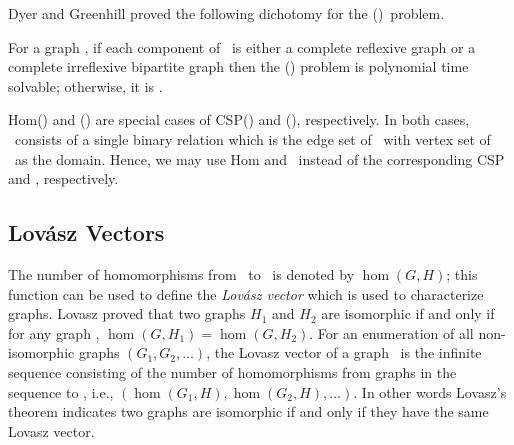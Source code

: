 Dyer and Greenhill proved the following dichotomy for the \chom(\mH)\ problem.
\begin{theorem} 
For a graph \mH, if each component of \mH\ is either a complete reflexive graph
or a complete irreflexive bipartite graph then the \chom(\mH) problem 
is polynomial time solvable; otherwise, it is \cpc\@.
\end{theorem}

Hom(\mH) and \chom(\mH) are special cases of CSP(\mrelset) and \ccsp(\mrelset),
respectively. In both cases, \mrelset\ consists of a single binary relation which is the
edge set of \mH\ with vertex set of \mH\ as the domain.
Hence, we may use Hom and \chom\ instead of
the corresponding CSP and \ccsp, respectively. 

\subsection*{Lov\'{a}sz Vectors}
The number of homomorphisms from \mG\ to \mH\ is denoted by \(\hom(G,H)\); this function
can be used to define the \emph{Lov\'{a}sz vector} which is used to characterize graphs.
Lovasz \cite{lovasz} proved that
two graphs \(H_1\) and \(H_2\) are isomorphic if and only if for any graph \mG,
\(\hom(G,H_1)=\hom(G,H_2)\). 
For an enumeration of all non-isomorphic graphs \((G_1,G_2,\dotsc)\), 
the Lovasz vector of a graph \mH\ is the infinite sequence consisting of the number of
homomorphisms from graphs in the sequence to \mH, i.e.,
\((\hom(G_1,H), \hom(G_2,H), \dotsc)\)\@. 
In other words Lovasz's theorem indicates two graphs are isomorphic if and only if
they have the same Lovasz vector.  
\begin{comment}
Lov\'{a}sz and et al. \cite{propertytesting} used the Lov\'{a}sz vector
for \emph{Edge Reconstruction} problem over graphs with sufficiently many edges, 
They also used Lov\'{a}sz vector in the {\em Property Testing} area.
In this model there is usually a huge graph and at each step only small sample of vertices
can be examined. The goal is to infer parameters of the graph using small samples of it. 
A good example of such a graph one might want to find the properties is the Internet.
\end{comment}



